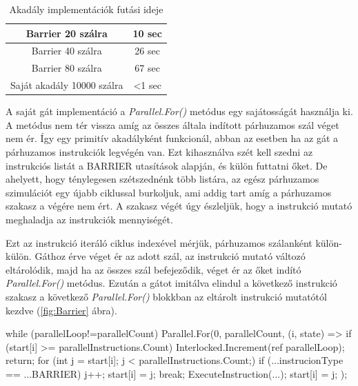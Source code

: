 \begin{table}[h]
\centering
\caption{Akadály implementációk futási ideje}
\label{tab:barrier}
\begin{tabular}{|c|c|}
\hline
Barrier 20 szálra & 10 sec  \\
\hline
Barrier 40 szálra & 26 sec \\
\hline
Barrier 80 szálra & 67 sec \\
\hline 
Saját akadály 10000 szálra & <1 sec \\
\hline
\end{tabular}
\end{table}

A saját gát implementáció a \textit{Parallel.For()} metódus egy sajátosságát használja ki. A metódus nem tér vissza amíg az összes általa indított párhuzamos szál véget nem ér. Így egy primitív akadályként funkcionál, abban az esetben ha az gát a párhuzamos instrukciók legvégén van. Ezt kihasználva szét kell szedni az instrukciós listát a BARRIER utasítások alapján, és külön futtatni őket. De ahelyett, hogy ténylegesen szétszednénk több listára, az egész párhuzamos szimulációt egy újabb ciklussal burkoljuk, ami addig tart amíg a párhuzamos szakasz a végére nem ért. A szakasz végét úgy észleljük, hogy a instrukció mutató meghaladja az instrukciók mennyiségét. 

Ezt az instrukció iteráló ciklus indexével mérjük, párhuzamos szálanként külön-külön. Gáthoz érve véget ér az adott szál, az instrukció mutató változó eltárolódik, majd ha az összes szál befejeződik, véget ér az őket indító \textit{Parallel.For()} metódus. Ezután a gátot imitálva elindul a következő instrukció szakasz a következő \textit{Parallel.For()} blokkban az eltárolt instrukció mutatótól kezdve (\ref{fig:Barrier} ábra). 



\begin{cpp}
while (parallelLoop!=parallelCount)
    {
        Parallel.For(0, parallelCount, (i, state) =>
        {
            if (start[i] >= parallelInstructions.Count)
            {
                Interlocked.Increment(ref parallelLoop);
                return;
            } 
            for (int j = start[i]; j < parallelInstructions.Count;)
            {
                if (...instrucionType == ...BARRIER)
                   {
                       j++;
                       start[i] = j;
                       break;
                   }
                ExecuteInstruction(...);
                start[i] = j;
            }
        });
    }
\end{cpp}

